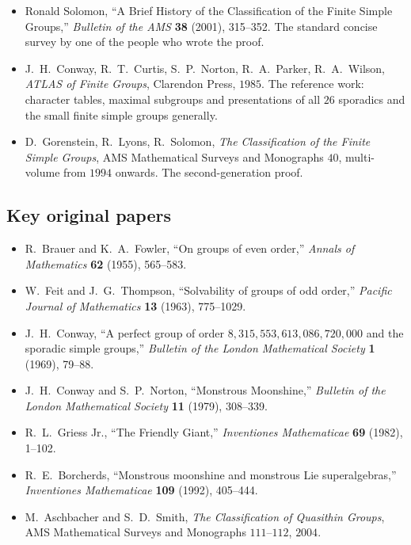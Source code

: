 \documentclass[11pt]{article}
\begin{document}
\begin{itemize}[leftmargin=*, itemsep=2pt]
  \item Ronald Solomon, ``A Brief History of the Classification of
        the Finite Simple Groups,'' \emph{Bulletin of the AMS}
        \textbf{38} (2001), 315--352. The standard concise survey
        by one of the people who wrote the proof.
  \item J.\ H.\ Conway, R.\ T.\ Curtis, S.\ P.\ Norton, R.\ A.\
        Parker, R.\ A.\ Wilson, \emph{ATLAS of Finite Groups},
        Clarendon Press, $1985$. The reference work: character
        tables, maximal subgroups and presentations of all $26$
        sporadics and the small finite simple groups generally.
  \item D.\ Gorenstein, R.\ Lyons, R.\ Solomon, \emph{The
        Classification of the Finite Simple Groups}, AMS
        Mathematical Surveys and Monographs $40$, multi-volume from
        $1994$ onwards. The second-generation proof.
\end{itemize}

\subsection*{Key original papers}

\begin{itemize}[leftmargin=*, itemsep=2pt]
  \item R.\ Brauer and K.\ A.\ Fowler, ``On groups of even order,''
        \emph{Annals of Mathematics} \textbf{62} (1955), 565--583.
  \item W.\ Feit and J.\ G.\ Thompson, ``Solvability of groups of
        odd order,'' \emph{Pacific Journal of Mathematics}
        \textbf{13} (1963), 775--1029.
  \item J.\ H.\ Conway, ``A perfect group of order
        $8{,}315{,}553{,}613{,}086{,}720{,}000$ and the sporadic
        simple groups,'' \emph{Bulletin of the London Mathematical
        Society} \textbf{1} (1969), 79--88.
  \item J.\ H.\ Conway and S.\ P.\ Norton, ``Monstrous Moonshine,''
        \emph{Bulletin of the London Mathematical Society}
        \textbf{11} (1979), 308--339.
  \item R.\ L.\ Griess Jr., ``The Friendly Giant,''
        \emph{Inventiones Mathematicae} \textbf{69} (1982),
        1--102.
  \item R.\ E.\ Borcherds, ``Monstrous moonshine and monstrous Lie
        superalgebras,'' \emph{Inventiones Mathematicae}
        \textbf{109} (1992), 405--444.
  \item M.\ Aschbacher and S.\ D.\ Smith, \emph{The Classification
        of Quasithin Groups}, AMS Mathematical Surveys and
        Monographs $111$--$112$, $2004$.
\end{itemize}
\end{document}
